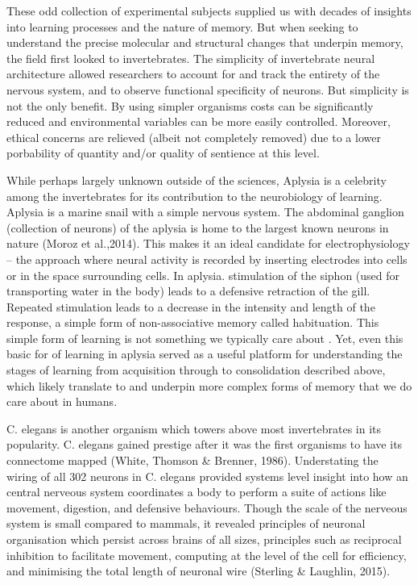 \documentclass[
  letterpaper,
  DIV=11,
  numbers=noendperiod,
  oneside]{scrartcl}
\begin{document}
These odd collection of experimental subjects supplied us with decades
of insights into learning processes and the nature of memory. But when
seeking to understand the precise molecular and structural changes that
underpin memory, the field first looked to invertebrates. The simplicity
of invertebrate neural architecture allowed researchers to account for
and track the entirety of the nervous system, and to observe functional
specificity of neurons. But simplicity is not the only benefit. By using
simpler organisms costs can be significantly reduced and environmental
variables can be more easily controlled. Moreover, ethical concerns are
relieved (albeit not completely removed) due to a lower porbability of
quantity and/or quality of sentience at this level.

While perhaps largely unknown outside of the sciences, Aplysia is a
celebrity among the invertebrates for its contribution to the
neurobiology of learning. Aplysia is a marine snail with a simple
nervous system. The abdominal ganglion (collection of neurons) of the
aplysia is home to the largest known neurons in nature (Moroz et
al.,2014). This makes it an ideal candidate for electrophysiology -- the
approach where neural activity is recorded by inserting electrodes into
cells or in the space surrounding cells. In aplysia. stimulation of the
siphon (used for transporting water in the body) leads to a defensive
retraction of the gill. Repeated stimulation leads to a decrease in the
intensity and length of the response, a simple form of non-associative
memory called habituation. This simple form of learning is not something
we typically care about . Yet, even this basic for of learning in
aplysia served as a useful platform for understanding the stages of
learning from acquisition through to consolidation described above,
which likely translate to and underpin more complex forms of memory that
we do care about in humans.

C. elegans is another organism which towers above most invertebrates in
its popularity. C. elegans gained prestige after it was the first
organisms to have its connectome mapped (White, Thomson \& Brenner,
1986). Understating the wiring of all 302 neurons in C. elegans provided
systems level insight into how an central nerveous system coordinates a
body to perform a suite of actions like movement, digestion, and
defensive behaviours. Though the scale of the nerveous system is small
compared to mammals, it revealed principles of neuronal organisation
which persist across brains of all sizes, principles such as reciprocal
inhibition to facilitate movement, computing at the level of the cell
for efficiency, and minimising the total length of neuronal wire
(Sterling \& Laughlin, 2015).
\end{document}
